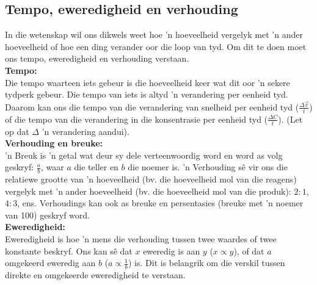 \subsection*{Tempo, eweredigheid en verhouding}
In die wetenskap wil ons dikwels weet hoe  'n hoeveelheid vergelyk met  'n ander hoeveelheid of hoe een ding verander oor die loop van tyd. Om dit te doen moet ons tempo, eweredigheid en verhouding verstaan. \\
\textbf{Tempo:}\\
Die tempo waarteen iets gebeur is die hoeveelheid keer wat dit oor  'n sekere tydperk gebeur. Die tempo van iets is altyd  'n verandering per eenheid tyd. Daarom kan ons die tempo van die verandering van snelheid per eenheid tyd ($\frac{\Delta \vec{v}}{t}$) of die tempo van die verandering in die konsentrasie per eenheid tyd ($\frac{\Delta{C}}{t}$). (Let op dat $\Delta$  'n verandering aandui). \\
\textbf{Verhouding en breuke:}\\
 'n Breuk is  'n getal wat deur sy dele verteenwoordig word en word as volg geskryf: $\frac{a}{b}$, waar $a$ die teller en $b$ die noemer is.  'n Verhouding sê vir ons die relatiewe grootte van  'n hoeveelheid (bv. die hoeveelheid mol van die reagens) vergelyk met  'n ander hoeveelheid (bv. die hoeveelheid mol van die produk): $2:1$, $4:3$, ens. Verhoudings kan ook as breuke en persentasies (breuke met  'n noemer van 100) geskryf word.\\
\textbf{Eweredigheid:}\\
Eweredigheid is hoe  'n mens die verhouding tussen twee waardes of twee konstante beskryf. Ons kan sê dat $x$ eweredig is aan $y$ ($x \propto y$), of dat $a$ omgekeerd eweredig aan $b$ ($a \propto \frac{1}{b}$) is. Dit is belangrik om die verskil tussen direkte en omgekeerde eweredigheid te verstaan.
